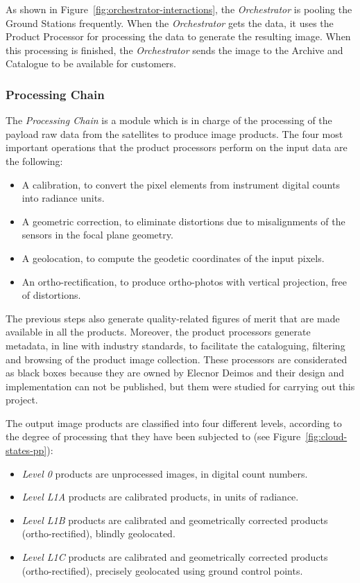 As shown in Figure~\ref{fig:orchestrator-interactions}, the \emph{Orchestrator} is
pooling the Ground Stations frequently. When the \emph{Orchestrator} gets the data,
it uses the Product Processor for processing the data to generate the resulting
image. When this processing is finished, the \emph{Orchestrator} sends the image to
the Archive and Catalogue to be available for customers.



\subsubsection{Processing Chain}


The \emph{Processing Chain} is a module which is in charge of the processing of the
payload raw data from the satellites to produce image products. The four most
important operations that the product processors perform on the input data are
the following:
\begin{itemize}
\item A calibration, to convert the pixel elements from instrument digital counts into radiance units.
\item A geometric correction, to eliminate distortions due to misalignments of the sensors in the focal plane geometry.
\item A geolocation, to compute the geodetic coordinates of the input pixels.
\item An ortho-rectification, to produce ortho-photos with vertical projection, free of distortions.
\end{itemize}

The previous steps also generate quality-related figures of merit that are made
available in all the products. Moreover, the product processors generate
metadata, in line with industry standards, to facilitate the cataloguing,
filtering and browsing of the product image collection. These processors are
considerated as black boxes because they are owned by Elecnor Deimos and their
design and implementation can not be published, but them were studied for
carrying out this project.

The output image products are classified into four different levels, according to the degree of processing that they have been subjected to (see Figure~\ref{fig:cloud-states-pp}):
\begin{itemize}

\item \emph{Level 0} products are unprocessed images, in digital count numbers.
\item \emph{Level L1A} products are calibrated products, in units of radiance.
\item \emph{Level L1B} products are calibrated and geometrically corrected products (ortho-rectified), blindly geolocated.
\item \emph{Level L1C} products are calibrated and geometrically corrected products (ortho-rectified), precisely geolocated using ground control points.
\end{itemize}

